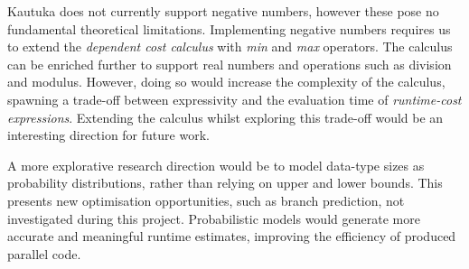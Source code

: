 Kautuka does not currently support negative numbers, however these pose no fundamental theoretical limitations. Implementing negative numbers requires us to extend the \textit{dependent cost calculus} with \textit{min} and \textit{max} operators. The calculus can be enriched further to support real numbers and operations such as division and modulus. However, doing so would increase the complexity of the calculus, spawning a trade-off between expressivity and the evaluation time of \textit{runtime-cost expressions}. Extending the calculus whilst exploring this trade-off would be an interesting direction for future work.

A more explorative research direction would be to model data-type sizes as probability distributions, rather than relying on upper and lower bounds. This presents new optimisation opportunities, such as branch prediction, not investigated during this project. Probabilistic models would generate more accurate and meaningful runtime estimates, improving the efficiency of produced parallel code. 